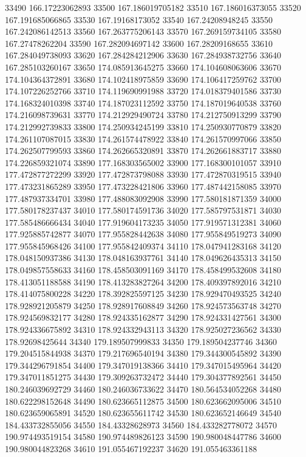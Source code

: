 {33490 166.17223062893
33500 167.186019705182
33510 167.186016373055
33520 167.191685066865
33530 167.19168173052
33540 167.24208948245
33550 167.242086142513
33560 167.263775206143
33570 167.269159734105
33580 167.27478262204
33590 167.282094697142
33600 167.28209168655
33610 167.284049738093
33620 167.284284212906
33630 167.284938732756
33640 167.285103260167
33650 174.085913645275
33660 174.104608063606
33670 174.104364372891
33680 174.102418975859
33690 174.106417259762
33700 174.107226252766
33710 174.119690991988
33720 174.018379401586
33730 174.168324010398
33740 174.187023112592
33750 174.187019640538
33760 174.216098739631
33770 174.212929490724
33780 174.212750913299
33790 174.212992739833
33800 174.250934245199
33810 174.250930770879
33820 174.261107087015
33830 174.261574478922
33840 174.261570997066
33850 174.262507799593
33860 174.262665320891
33870 174.262661883717
33880 174.226859321074
33890 177.168303565002
33900 177.168300101057
33910 177.472877272299
33920 177.472873798088
33930 177.472870319515
33940 177.473231865289
33950 177.473228421806
33960 177.487442158085
33970 177.487937334701
33980 177.488083092908
33990 177.580181871359
34000 177.580178237437
34010 177.580174591736
34020 177.585797531871
34030 177.585486666434
34040 177.919604173235
34050 177.919571312381
34060 177.925885742877
34070 177.955828442638
34080 177.955849519273
34090 177.955845968426
34100 177.955842409374
34110 178.047941283168
34120 178.048150937386
34130 178.048163937761
34140 178.049626435313
34150 178.049857558633
34160 178.458503091169
34170 178.458499532608
34180 178.413051188588
34190 178.413283827264
34200 178.409397892016
34210 178.414075800228
34220 178.392825597125
34230 178.929470493525
34240 178.928921205879
34250 178.928917608849
34260 178.924573563748
34270 178.924569832177
34280 178.924335162877
34290 178.924331427561
34300 178.924336675892
34310 178.924332943113
34320 178.925027236562
34330 178.92698425644
34340 179.189507999833
34350 179.189504237746
34360 179.204515844938
34370 179.217696540194
34380 179.344300545892
34390 179.344296791854
34400 179.347019138366
34410 179.347015495964
34420 179.347011851275
34430 179.309263732472
34440 179.304377892561
34450 180.246039692729
34460 180.246036733622
34470 180.564534052268
34480 180.622298152648
34490 180.623665112875
34500 180.623662095006
34510 180.623659065891
34520 180.623655611742
34530 180.623652146649
34540 184.433732855056
34550 184.43328628973
34560 184.433282778072
34570 190.974493519154
34580 190.974489826123
34590 190.980048447786
34600 190.980044823268
34610 191.055467192237
34620 191.055463361188
}
